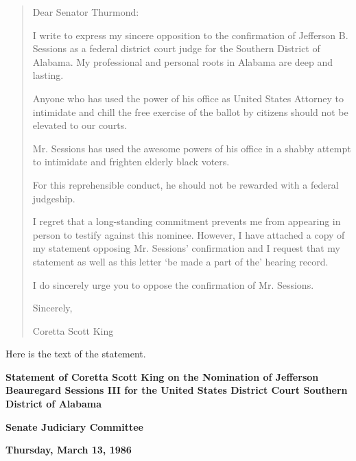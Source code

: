 \begin{quote}
Dear Senator Thurmond:

I write to express my sincere opposition to the confirmation of
Jefferson B. Sessions as a federal district court judge for the Southern
District of Alabama. My professional and personal roots in Alabama are
deep and lasting.

Anyone who has used the power of his office as United States Attorney to
intimidate and chill the free exercise of the ballot by citizens should
not be elevated to our courts.

Mr. Sessions has used the awesome powers of his office in a shabby
attempt to intimidate and frighten elderly black voters.

For this reprehensible conduct, he should not be rewarded with a federal
judgeship.

I regret that a long-standing commitment prevents me from appearing in
person to testify against this nominee. However, I have attached a copy
of my statement opposing Mr. Sessions' confirmation and I request that
my statement as well as this letter `be made a part of the' hearing
record.

I do sincerely urge you to oppose the confirmation of Mr. Sessions.

Sincerely,

Coretta Scott King
\end{quote}

Here is the text of the statement.

\textbf{Statement of Coretta Scott King on the Nomination of Jefferson
Beauregard Sessions III for the United States District Court Southern
District of Alabama}

\textbf{Senate Judiciary Committee}

\textbf{Thursday, March 13, 1986}

